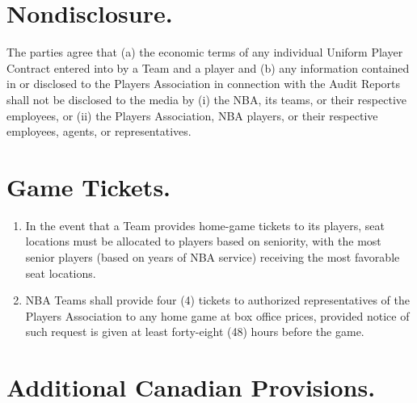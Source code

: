 \documentclass[
]{book}
\providecommand{\tightlist}{%
  \setlength{\itemsep}{0pt}\setlength{\parskip}{0pt}}
\begin{document}
\hypertarget{nondisclosure.}{%
\section{Nondisclosure.}\label{nondisclosure.}}

The parties agree that (a) the economic terms of any individual Uniform Player Contract entered into by a Team and a player and (b) any information contained in or disclosed to the Players Association in connection with the Audit Reports shall not be disclosed to the media by (i) the NBA, its teams, or their respective employees, or (ii) the Players Association, NBA players, or their respective employees, agents, or representatives.

\hypertarget{game-tickets.}{%
\section{Game Tickets.}\label{game-tickets.}}

\begin{enumerate}
\def\labelenumi{(\alph{enumi})}
\tightlist
\item
  In the event that a Team provides home-game tickets to its players, seat locations must be allocated to players based on seniority, with the most senior players (based on years of NBA service) receiving the most favorable seat locations.
\item
  NBA Teams shall provide four (4) tickets to authorized representatives of the Players Association to any home game at box office prices, provided notice of such request is given at least forty-eight (48) hours before the game.
\end{enumerate}

\hypertarget{additional-canadian-provisions.}{%
\section{Additional Canadian Provisions.}\label{additional-canadian-provisions.}}
\end{document}
